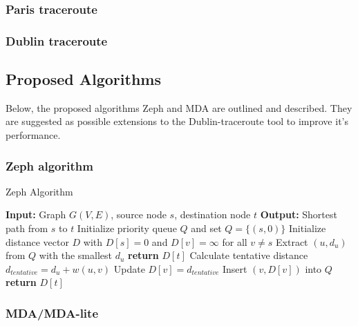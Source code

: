 \subsubsection{Paris traceroute}

\subsubsection{Dublin traceroute}

\subsection{Proposed Algorithms}
Below, the proposed algorithms Zeph and MDA are outlined and described. They are suggested as possible extensions to the Dublin-traceroute tool to improve it's performance.  

\subsubsection{Zeph algorithm}

\begin{algorithm}
\caption{Zeph Algorithm}\label{alg:zeph}
\begin{algorithmic}[1]
\State \textbf{Input:} Graph $G(V, E)$, source node $s$, destination node $t$
\State \textbf{Output:} Shortest path from $s$ to $t$
\State Initialize priority queue $Q$ and set $Q = \{(s, 0)\}$
\State Initialize distance vector $D$ with $D[s] = 0$ and $D[v] = \infty$ for all $v \neq s$
    \State Extract $(u, d_u)$ from $Q$ with the smallest $d_u$
        \State \textbf{return} $D[t]$
    \EndIf
        \State Calculate tentative distance $d_{tentative} = d_u + w(u, v)$
            \State Update $D[v] = d_{tentative}$
            \State Insert $(v, D[v])$ into $Q$
        \EndIf
    \EndFor
\EndWhile
\State \textbf{return} $D[t]$ 
\end{algorithmic}
\end{algorithm}

\subsubsection{ MDA/MDA-lite}

